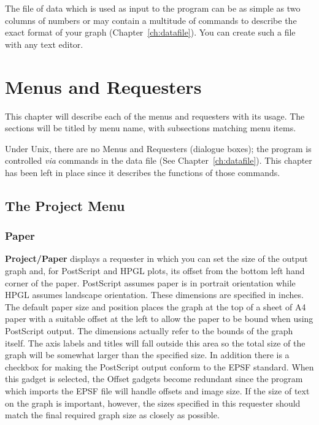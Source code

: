 \documentclass{report}
\begin{document}
The file of data which is used as input to the program can be as simple as two 
columns of numbers or may contain a multitude of commands to describe the exact 
format of your graph (Chapter~\ref{ch:datafile}). You can create such a file with 
any text editor.





\chapter{Menus and Requesters}
\label{ch:menus}
This chapter will describe each of the menus and requesters with its usage. The 
sections will be titled by menu name, with subsections matching menu items.

Under Unix, there are no Menus and Requesters (dialogue boxes); the
program is controlled \emph{via} commands in the data file (See
Chapter~\ref{ch:datafile}). This chapter has been left in place since
it describes the functions of those commands.

\section{The Project Menu}


\subsection{Paper}
{\bf Project/Paper} displays a requester in which you can set 
the size of the output graph and, for PostScript and HPGL plots, its offset 
from the bottom left hand corner of the paper. PostScript assumes paper is in 
portrait orientation while HPGL assumes landscape orientation. These 
dimensions are specified in inches. The default paper size and position places 
the graph at the top of a sheet of A4 paper with a suitable offset at the left to 
allow the paper to be bound when using PostScript output. 
The dimensions actually refer to the bounds of the 
graph itself. The axis labels and titles will fall outside this area so the total 
size of the graph will be somewhat larger than the specified size.
In addition there is a checkbox for making the PostScript output conform to the
EPSF standard. When this gadget is selected, the Offset gadgets become 
redundant since the program which imports the EPSF file will handle offsets and image 
size. If the size of text on the graph is important, however, the sizes specified 
in this requester should match the final required graph size as closely as possible.
\end{document}
